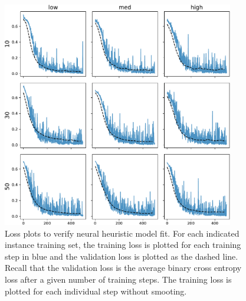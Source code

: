\documentclass[a4paper]{article}
\theoremstyle{definition}
\theoremstyle{plain}
\begin{document}
\begin{figure}
  \centering
  \includegraphics[width=0.9\textwidth]{figures/neural_fit.pdf}
  \caption{Loss plots to verify neural heuristic model fit. For each indicated
    instance training set, the training loss is plotted for each training step
    in blue and the validation loss is plotted as the dashed line. Recall that
    the validation loss is the average binary cross entropy loss after a given
    number of training steps. The training loss is plotted for each individual
    step without smooting.}
  \label{fig:neural_fit}
\end{figure}
\end{document}

